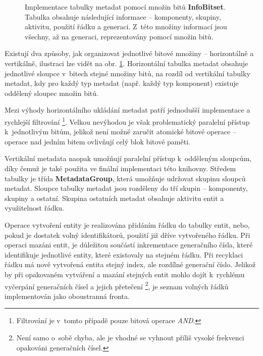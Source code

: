 \begin{figure}[H]
	\begin{center}
	\end{center}
	\caption{Implementace tabulky metadat pomocí množin bitů \textbf{InfoBitset}. Tabulka obsahuje následující informace -- komponenty, skupiny, aktivitu, použití řádku a generaci. Z~této množiny informací jsou všechny, až na generaci, reprezentovány pomocí množin bitů.}
	\label{Fig:IMPLMetadata}
\end{figure}

Existují dva způsoby, jak organizovat jednotlivé bitové množiny -- horizontálně a vertikálně, ilustraci lze vidět na obr. \ref{Fig:IMPLMetadata}. Horizontální tabulka metadat obsahuje jednotlivé sloupce v~bitech stejné množiny bitů, na rozdíl od vertikální tabulky metadat, kdy pro každý typ metadat (např. každý typ komponent) existuje oddělený sloupec množin bitů. 

Mezi výhody horizontálního ukládání metadat patří jednodušší implementace a rychlejší filtrování \footnote{Filtrování je v~tomto případě pouze bitová operace \emph{AND}.}. Velkou nevýhodou je však problematický paralelní přístup k~jednotlivým bitům, jelikož není možné zaručit atomické bitové operace -- operace nad jedním bitem ovlivňují celý blok bitové paměti. 

Vertikální metadata naopak umožňují paralelní přístup k~odděleným sloupcům, díky čemuž je také použita ve finální implementaci této knihovny. Středem tabulky je třída \textbf{MetadataGroup}, která umožňuje udržovat skupinu sloupců metadat. Sloupce tabulky metadat jsou rozděleny do tří skupin -- komponenty, skupiny a ostatní. Skupina ostatních metadat obsahuje aktivitu entit a využitelnost řádku.

Operace vytvoření entity je realizována přidáním řádku do tabulky entit, nebo, pokud je dostatek volný identifikátorů, použití již dříve vytvořeného řádku. Při operaci mazáni entit, je důležitou součástí inkrementace generačního čísla, které identifikuje jednotlivé entity, které existovaly na stejném řádku. Při recyklaci řádku má nově vytvořená entita stejný index, ale rozdílné generační číslo. Jelikož by při opakovaném vytváření a mazání stejných entit mohlo dojít k~rychlému vyčerpání generačních čísel a jejich přetečení \footnote{Není samo o~sobě chyba, ale je vhodné se vyhnout příliš vysoké frekvenci opakováni generačních čísel.}, je seznam volných řádků implementován jako oboustranná fronta.

